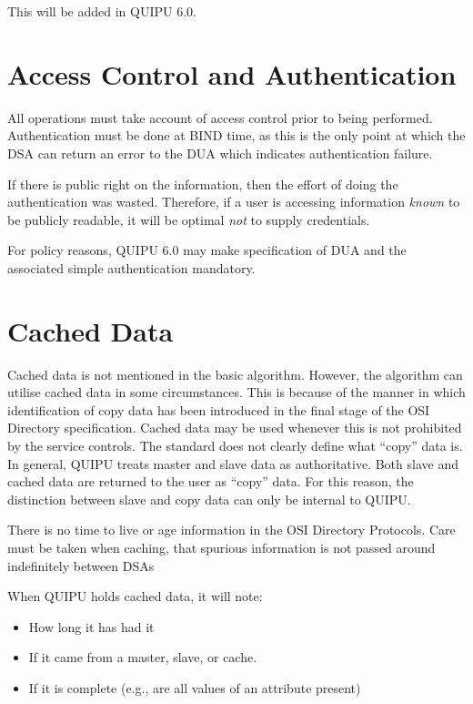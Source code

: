 This will be added in QUIPU 6.0.

\section {Access Control and Authentication}

All operations must take account of access control prior to being performed.
Authentication must be done at BIND time, as this is the only point at which
the DSA can return an error to the DUA which indicates authentication
failure.

If there is public right on the information, then the effort of doing the
authentication was wasted.
Therefore, if a user is accessing information {\em known} to be publicly
readable, it will be optimal {\em not} to supply credentials.

For policy reasons, QUIPU 6.0 may make specification of DUA and the
associated simple authentication mandatory.  

\section {Cached Data}
\label {cache-all}

Cached data is not mentioned in the basic algorithm.
However, the algorithm can utilise cached
data in some circumstances.
This is because of the manner in which identification of copy data has been
introduced in the final stage of the OSI Directory specification.
Cached data may be used whenever this is not prohibited by the service
controls.
The standard does not clearly define what ``copy'' data is.  In general,
QUIPU treats master and slave data as authoritative.
Both slave and cached data are returned to the user as
``copy'' data.  For this reason, the distinction between slave and copy data
can only be internal to QUIPU.

There is no time to live or age information in the OSI Directory Protocols.
Care must be taken when caching, that spurious information is not passed
around indefinitely between DSAs

When QUIPU holds cached data, it will note:

\begin {itemize}
\item How long it has had it
\item If it came from a master, slave, or cache.  
\item If it is complete (e.g., are all values of an attribute present)
\end {itemize}

